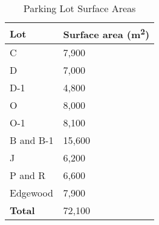 \documentclass[man]{apa7}
\begin{document}
	\begin{table}[h!]
		\caption{Parking Lot Surface Areas}
		\begin{tabular}{|l|l|}
			\hline
			\textbf{Lot} & \textbf{Surface area (m\textsuperscript{2})} \\ \hline
			C            & 7,900                 \\ \hline
			D            & 7,000                 \\ \hline
			D-1          & 4,800                 \\ \hline
			O            & 8,000                 \\ \hline
			O-1          & 8,100                 \\ \hline
			B and B-1    & 15,600                \\ \hline
			J            & 6,200                 \\ \hline
			P and R      & 6,600                 \\ \hline
			Edgewood     & 7,900                 \\ \hline
			\textbf{Total} & 72,100				\\ \hline
		\end{tabular}
		\label{tbl:LotAreas}
	\end{table}

	
	



	
\end{document}
